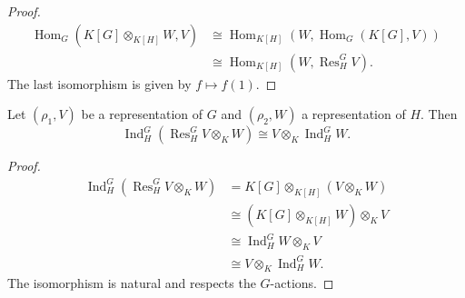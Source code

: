 \begin{proof}
\[
\begin{aligned}
\operatorname{Hom}_G(K[G] \otimes_{K[H]} W, V)
&\cong \operatorname{Hom}_{K[H]}(W, \operatorname{Hom}_G(K[G], V)) \\
&\cong \operatorname{Hom}_{K[H]}(W, \operatorname{Res}_H^G V).
\end{aligned}
\]
The last isomorphism is given by \(f \mapsto f(1)\).
\end{proof}


\begin{thm}\label{Tensor Product--Induction Adjunction}
Let \((\rho_1,V)\) be a representation of $G$ and \((\rho_2,W)\) a representation of $H$. Then
\[
\operatorname{Ind}_H^G( \operatorname{Res}_H^G V \otimes_K W ) \cong V \otimes_K \operatorname{Ind}_H^G W.
\]
\end{thm}

\begin{proof}
\[
\begin{aligned}
\operatorname{Ind}_H^G( \operatorname{Res}_H^G V \otimes_K W )
&= K[G] \otimes_{K[H]} (V \otimes_K W) \\
&\cong (K[G] \otimes_{K[H]} W) \otimes_K V \\
&\cong \operatorname{Ind}_H^G W \otimes_K V \\
&\cong V \otimes_K \operatorname{Ind}_H^G W.
\end{aligned}
\]
The isomorphism is natural and respects the \(G\)-actions.

\end{proof}

